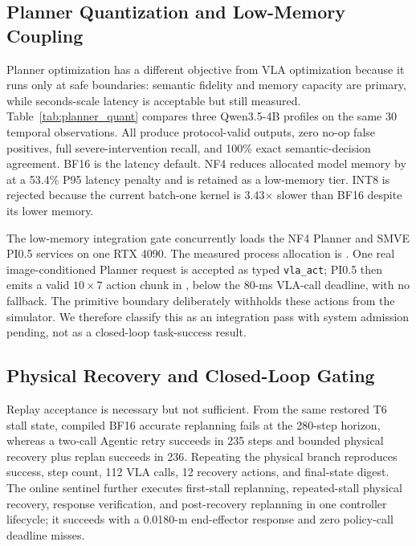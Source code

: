 \documentclass[runningheads]{waica}
\begin{document}
\subsection{Planner Quantization and Low-Memory Coupling}

Planner optimization has a different objective from VLA optimization because
it runs only at safe boundaries: semantic fidelity and memory capacity are
primary, while seconds-scale latency is acceptable but still measured.
Table~\ref{tab:planner_quant} compares three Qwen3.5-4B profiles on the same 30
temporal observations. All produce protocol-valid outputs, zero no-op false
positives, full severe-intervention recall, and 100\% exact semantic-decision
agreement. BF16 is the latency default. NF4 reduces allocated model memory by
\CarvePlannerNfMemoryReduction{} at a 53.4\% P95 latency penalty and is retained
as a low-memory tier. INT8 is rejected because the current batch-one kernel is
3.43$\times$ slower than BF16 despite its lower memory.



The low-memory integration gate concurrently loads the NF4 Planner and SMVE
PI0.5 services on one RTX 4090. The measured process allocation is
\CarveLowMemoryPair{}. One real image-conditioned Planner request is accepted
as typed \texttt{vla\_act}; PI0.5 then emits a valid $10\!\times\!7$ action
chunk in \CarveLowMemoryVlaLatency{}, below the 80-ms VLA-call deadline, with
no fallback. The primitive boundary deliberately withholds these actions from
the simulator. We therefore classify this as an integration pass with system
admission pending, not as a closed-loop task-success result.

\subsection{Physical Recovery and Closed-Loop Gating}

Replay acceptance is necessary but not sufficient. From the same restored T6
stall state, compiled BF16 accurate replanning fails at the 280-step horizon,
whereas a two-call Agentic retry succeeds in 235 steps and bounded physical
recovery plus replan succeeds in 236. Repeating the physical branch reproduces
success, step count, 112 VLA calls, 12 recovery actions, and final-state digest.
The online sentinel further executes first-stall replanning, repeated-stall
physical recovery, response verification, and post-recovery replanning in one
controller lifecycle; it succeeds with a 0.0180-m end-effector response and
zero policy-call deadline misses.
\end{document}
